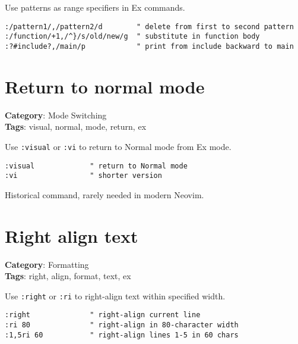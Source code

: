 {{{{{Use patterns as range specifiers in Ex commands.

\begin{Exa*}{}
\begin{Verbatim}[fontsize=\footnotesize, breaklines, breakanywhere]
:/pattern1/,/pattern2/d        " delete from first to second pattern
:/function/+1,/^}/s/old/new/g  " substitute in function body
:?#include?,/main/p            " print from include backward to main
\end{Verbatim}
\end{Exa*}

\section{Return to normal mode}

\textbf{Category}: Mode Switching\\ \textbf{Tags}: visual, normal, mode, return, ex
\vspace{0.5cm}

Use {\footnotesize \Verb§:visual§} or {\footnotesize \Verb§:vi§} to return to Normal mode from Ex mode.

\begin{Exa*}{}
\begin{Verbatim}[fontsize=\footnotesize, breaklines, breakanywhere]
:visual             " return to Normal mode
:vi                 " shorter version
\end{Verbatim}
\end{Exa*}

Historical command, rarely needed in modern Neovim.

\section{Right align text}

\textbf{Category}: Formatting\\ \textbf{Tags}: right, align, format, text, ex
\vspace{0.5cm}

Use {\footnotesize \Verb§:right§} or {\footnotesize \Verb§:ri§} to right-align text within specified width.

\begin{Exa*}{}
\begin{Verbatim}[fontsize=\footnotesize, breaklines, breakanywhere]
:right              " right-align current line
:ri 80              " right-align in 80-character width
:1,5ri 60           " right-align lines 1-5 in 60 chars
\end{Verbatim}
\end{Exa*}

}}}}}
